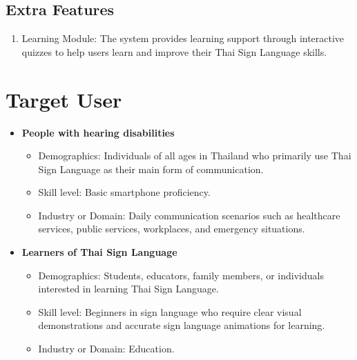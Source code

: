 \subsection{Extra Features}
\label{subsection:features}

\begin{enumerate}[leftmargin=80pt]
    \item Learning Module: The system provides learning support through interactive quizzes to help users learn and improve their Thai Sign Language skills.
\end{enumerate}
\newpage
\section{Target User}
\label{section:target-user}

\begin{itemize}

\item \textbf{People with hearing disabilities}
\begin{itemize}
    \item Demographics: Individuals of all ages in Thailand who primarily use Thai Sign Language as their main form of communication.
    \item Skill level: Basic smartphone proficiency.
    \item Industry or Domain: Daily communication scenarios such as healthcare services, public services, workplaces, and emergency situations.
\end{itemize}

\item \textbf{Learners of Thai Sign Language}
\begin{itemize}
    \item Demographics: Students, educators, family members, or individuals interested in learning Thai Sign Language.
    \item Skill level: Beginners in sign language who require clear visual demonstrations and accurate sign language animations for learning.
    \item Industry or Domain: Education.
\end{itemize}

\end{itemize}

\newpage
